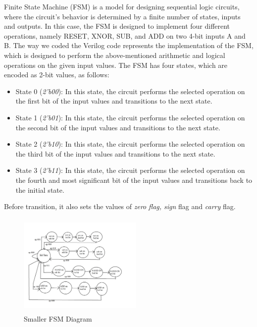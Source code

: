 Finite State Machine (FSM) is a model for designing sequential logic circuits,
where the circuit's behavior is determined by a finite number of states, inputs and outputs.
In this case, the FSM is designed to implement four different operations,
namely RESET, XNOR, SUB, and ADD on two 4-bit inputs A and B.
The way we coded the Verilog code represents the implementation of the FSM,
which is designed to perform the above-mentioned arithmetic and logical operations on the given input values.
The FSM has four states, which are encoded as 2-bit values, as follows:

\begin{itemize}
    \item State 0 (\textit{2'b00}): In this state, the circuit performs the selected operation on the first bit of the input values and transitions to the next state.
    \item State 1 (\textit{2'b01}): In this state, the circuit performs the selected operation on the second bit of the input values and transitions to the next state.
    \item State 2 (\textit{2'b10}): In this state, the circuit performs the selected operation on the third bit of the input values and transitions to the next state.
    \item State 3 (\textit{2'b11}): In this state, the circuit performs the selected operation on the fourth and most significant bit of the input values and transitions back to the initial state.
\end{itemize}

Before transition, it also sets the values of \textit{zero} \textit{flag, sign} flag and \textit{carry} flag.

\begin{figure}[htbp]
    \centerline{\includegraphics[height=5cm,width=6cm]{figures/fsm}}
    \caption{Smaller FSM Diagram}
    \label{fig:FSM}
\end{figure}


